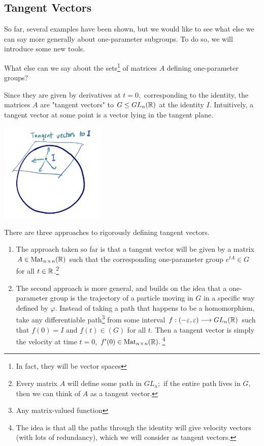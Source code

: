 \subsection{Tangent Vectors} %

So far, several examples have been shown, but we would like to see what else we can say more generally about one-parameter subgroups. To do so, we will introduce some new tools. %
\begin{qq}
What else can we say about the sets\footnote{In fact, they will be vector spaces} of matrices $A$ defining one-parameter groups? 
\end{qq}

Since they are given by derivatives at $t = 0,$ corresponding to the identity, the matrices $A$ are "tangent vectors" to $G \leq GL_n(\mathbb R)$ at the identity $I.$ Intuitively, a tangent vector at some point is a vector lying in the tangent plane. %

\begin{center}
    \includegraphics[width=5cm]{Lecture Files and Images/lec32-tangentvector.png}
\end{center}

There are three approaches to rigorously defining tangent vectors. \begin{enumerate}
    \item  The approach taken so far is that a tangent vector will be given by a matrix $A \in \text{Mat}_{n \hspace{0.05em}{\times}\hspace{0.05em} n}(\mathbb R)$ such that the corresponding one-parameter group $e^{tA} \in G$ for all $t \in \mathbb R$.\footnote{Every matrix $A$ will define some path in $GL_n;$ if the entire path lives in $G,$ then we can think of $A$ as a tangent vector.}
    \item The second approach is more general, and builds on the idea that a one-parameter group is the trajectory of a particle moving in $G$ in a specific way defined by $\varphi.$ Instead of taking a path that happens to be a homomorphism, take any differentiable path\footnote{Any matrix-valued function} from some interval $f: (-\varepsilon, \varepsilon) \longrightarrow GL_n(\mathbb R)$ such that $f(0) = I$ and $f(t) \in (G)$ for all $t.$ Then a tangent vector is simply the velocity at time $t = 0$, $f'(0) \in \text{Mat}_{n \hspace{0.05em}{\times}\hspace{0.05em} n}(\mathbb R).$\footnote{The idea is that all the paths through the identity will give velocity vectors (with lots of redundancy), which we will consider as tangent vectors.}
\end{enumerate}

